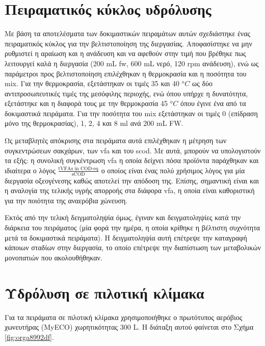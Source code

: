 \documentclass[11pt]{report}
\begin{document}
\section{Πειραματικός κύκλος υδρόλυσης}
\label{sec:orge7c7888}
\label{sec:lab-hydro}
Με βάση τα αποτελέσματα των δοκιμαστικών πειραμάτων αυτών σχεδιάστηκε ένας πειραματικός κύκλος για την βελτιστοποίηση της διεργασίας. Αποφασίστηκε να μην ρυθμιστεί η αραίωση και η ανάδευση και να αφεθούν στην τιμή που βρέθηκε πως λειτουργεί καλά η διεργασία (200 mL \acrshort{fw}, 600 mL νερό, 120 rpm ανάδευση), ενώ ως παράμετροι προς βελτιστοποίηση επιλέχθηκαν η θερμοκρασία και η ποσότητα του \acrshort{mix}. Για την θερμοκρασία, εξετάστηκαν οι τιμές 35 και 40 \(^oC\) ως δύο αντιπροσωπευτικές τιμές της μεσόφιλης περιοχής, ενώ όπου υπήρχε η δυνατότητα, εξετάστηκε και η διαφορά τους με την θερμοκρασία 45 \(^oC\) όπου έγινε ένα από τα δοκιμαστικά πειράματα. Για την ποσότητα του \acrshort{mix} εξετάστηκαν οι τιμές 0 (επίδραση μόνο της θερμοκρασίας), 1, 2, 4 και 8 ml ανά 200 mL FW. 

Ως μεταβλητές απόκρισης στα πειράματα αυτά επιλέχθηκαν η μέτρηση των συγκεντρώσεων σακχάρων, των \acrshort{vfa} και του \acrshort{scod}.  Με αυτά, μπορούν να υπολογιστούν τα εξής: η συνολική συγκέντρωση \acrshort{vfa} η οποία δείχνει πόσα προϊόντα παράχθηκαν και ιδιαίτερα ο λόγος \(\frac{\text{tVFAs in COD-eq}}{\text{sCOD}}\) ο οποίος είναι ένας πολύ χρήσιμος λόγος για μία διεργασία οξεογένεσης καθώς αποτελεί την απόδοση της. Επίσης, σημαντική είναι και η αναλογία της τελικής υγρής απορροής στα διάφορα \acrshort{vfa}, η οποία είναι καθοριστική για την ποιότητα της αναερόβια χώνευση.

Εκτός από την τελική δειγματοληψία όμως, έγιναν και δειγματοληψίες κατά την διάρκεια του πειράματος (μία φορά την ημέρα, η οποία κρίθηκε η βέλτιστη συχνότητα μετά τα δοκιμαστικά πειράματα). Η δειγματοληψία αυτή επέτρεψε την καταγραφή κάποιων σταδίων στην διεργασία, το οποίο επέτρεψε την διαπίστωση των μεταβολικών μονοπατιών που ακολουθήθηκαν.

\section{Υδρόλυση σε πιλοτική κλίμακα}
\label{sec:org0ec7aa9}
\label{sec:pilot-exp}

Για τα πειράματα σε πιλοτική κλίμακα χρησιμοποιήθηκε ο πρωτότυπος αερόβιος χωνευτήρας (MyECO) χωρητικότητας 300 L. Η διάταξη αυτού φαίνεται στο Σχήμα \ref{fig:orga8992df}.
\end{document}
